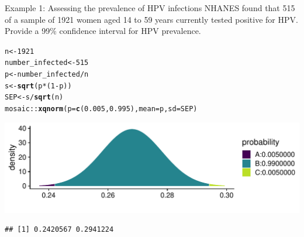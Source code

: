 \documentclass[10pt,handout]{beamer}\usepackage[]{graphicx}\usepackage[]{color}
\makeatletter
\def\maxwidth{ %
  \ifdim\Gin@nat@width>\linewidth
    \linewidth
  \else
    \Gin@nat@width
  \fi
}
\newcommand{\hlnum}[1]{\textcolor[rgb]{0.686,0.059,0.569}{#1}}%
\newcommand{\hlopt}[1]{\textcolor[rgb]{0,0,0}{#1}}%
\newcommand{\hlstd}[1]{\textcolor[rgb]{0.345,0.345,0.345}{#1}}%
\newcommand{\hlkwb}[1]{\textcolor[rgb]{0.69,0.353,0.396}{#1}}%
\newcommand{\hlkwc}[1]{\textcolor[rgb]{0.333,0.667,0.333}{#1}}%
\newcommand{\hlkwd}[1]{\textcolor[rgb]{0.737,0.353,0.396}{\textbf{#1}}}%
\newenvironment{kframe}{%
 \def\at@end@of@kframe{}%
 \ifinner\ifhmode%
  \def\at@end@of@kframe{\end{minipage}}%
  \begin{minipage}{\columnwidth}%
 \fi\fi%
 \def\FrameCommand##1{\hskip\@totalleftmargin \hskip-\fboxsep
 \colorbox{shadecolor}{##1}\hskip-\fboxsep
     \hskip-\linewidth \hskip-\@totalleftmargin \hskip\columnwidth}%
 \MakeFramed {\advance\hsize-\width
   \@totalleftmargin\z@ \linewidth\hsize
   \@setminipage}}%
 {\par\unskip\endMakeFramed%
 \at@end@of@kframe}
\newenvironment{knitrout}{}{} %
\makeatother
\begin{document}
\begin{frame}[fragile]{Example 1: Assessing the prevalence of HPV infections}
	\small
	NHANES found that 515 of a sample of 1921 women aged 14 to 59 years currently tested positive for HPV. Provide a 99\% confidence interval for HPV prevalence. 
	
\begin{knitrout}\tiny
{}\color{fgcolor}\begin{kframe}
\begin{alltt}
\hlstd{n} \hlkwb{<-} \hlnum{1921}
\hlstd{number_infected} \hlkwb{<-} \hlnum{515}
\hlstd{p} \hlkwb{<-} \hlstd{number_infected} \hlopt{/} \hlstd{n}
\hlstd{s} \hlkwb{<-} \hlkwd{sqrt}\hlstd{(p} \hlopt{*} \hlstd{(}\hlnum{1} \hlopt{-} \hlstd{p))}
\hlstd{SEP} \hlkwb{<-} \hlstd{s} \hlopt{/} \hlkwd{sqrt}\hlstd{(n)}
\hlstd{mosaic}\hlopt{::}\hlkwd{xqnorm}\hlstd{(}\hlkwc{p}\hlstd{=}\hlkwd{c}\hlstd{(}\hlnum{0.005}\hlstd{,}\hlnum{0.995}\hlstd{),} \hlkwc{mean} \hlstd{= p,} \hlkwc{sd} \hlstd{= SEP)}
\end{alltt}
\end{kframe}

{\centering \includegraphics[width=\maxwidth]{figure/unnamed-chunk-14-1} 

}


\begin{kframe}\begin{verbatim}
## [1] 0.2420567 0.2941224
\end{verbatim}
\end{kframe}
\end{knitrout}
	
\end{frame}
\end{document}
